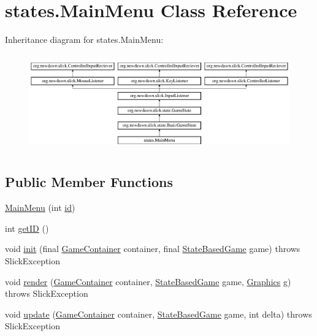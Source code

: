 \hypertarget{classstates_1_1_main_menu}{}\section{states.\+Main\+Menu Class Reference}
\label{classstates_1_1_main_menu}
Inheritance diagram for states.\+Main\+Menu\+:\begin{figure}[H]
\begin{center}
\leavevmode
\includegraphics[height=4.226415cm]{classstates_1_1_main_menu}
\end{center}
\end{figure}
\subsection*{Public Member Functions}
\begin{DoxyCompactItemize}
\item 
\mbox{\hyperlink{classstates_1_1_main_menu_adc73381b13644459bfc6502313f80241}{Main\+Menu}} (int \mbox{\hyperlink{classstates_1_1_main_menu_acdd02005ac38a76e9d4e5bca1e33fb4c}{id}})
\item 
int \mbox{\hyperlink{classstates_1_1_main_menu_adbf17a27cb74ddf0365ca09fd0758b3f}{get\+ID}} ()
\item 
void \mbox{\hyperlink{classstates_1_1_main_menu_adbc27fa7433e43c8cbb8bb86db82daa1}{init}} (final \mbox{\hyperlink{classorg_1_1newdawn_1_1slick_1_1_game_container}{Game\+Container}} container, final \mbox{\hyperlink{classorg_1_1newdawn_1_1slick_1_1state_1_1_state_based_game}{State\+Based\+Game}} game)  throws Slick\+Exception 
\item 
void \mbox{\hyperlink{classstates_1_1_main_menu_ad36f80560779b3cf28f76f2a44d640de}{render}} (\mbox{\hyperlink{classorg_1_1newdawn_1_1slick_1_1_game_container}{Game\+Container}} container, \mbox{\hyperlink{classorg_1_1newdawn_1_1slick_1_1state_1_1_state_based_game}{State\+Based\+Game}} game, \mbox{\hyperlink{classorg_1_1newdawn_1_1slick_1_1_graphics}{Graphics}} g)  throws Slick\+Exception 
\item 
void \mbox{\hyperlink{classstates_1_1_main_menu_a83292d85c5e93f8209e65afdfed4d5da}{update}} (\mbox{\hyperlink{classorg_1_1newdawn_1_1slick_1_1_game_container}{Game\+Container}} container, \mbox{\hyperlink{classorg_1_1newdawn_1_1slick_1_1state_1_1_state_based_game}{State\+Based\+Game}} game, int delta)  throws Slick\+Exception 
\end{DoxyCompactItemize}
